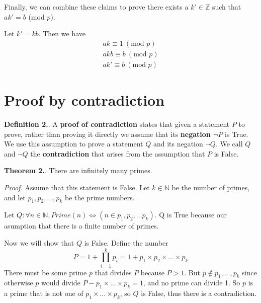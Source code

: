 \documentclass{article}
\newcounter{defcount}
\newcounter{thcount}
\newcommand\df{\stepcounter{defcount} \textbf{Definition 2.\thedefcount}. }
\newcommand\tr{\stepcounter{thcount} \textbf{Theorem 2.\thethcount}. }
\begin{document}
Finally, we can combine these claims to prove there exists a $k' \in \mathbb{Z}$ 
such that $ak' = b$ (mod $p$).

Let $k' = kb$. Then we have 
\begin{align*}
    ak \equiv 1 \:(\text{mod } p) \\
    akb \equiv b \:(\text{mod } p) \\
    ak' \equiv b \:(\text{mod } p) 
\end{align*}

\section{Proof by contradiction}
\df A \textbf{proof of contradiction} states that given a statement $P$ to 
prove, rather than proving it directly we assume that its \textbf{negation
$\neg P$} is True. We use this assumption to prove a statement $Q$ and its 
negation $\neg Q$. We call $Q$ and $\neg Q$ the \textbf{contradiction} that 
arises from the assumption that $P$ is False.

\tr There are infinitely many primes.

\textit{Proof.} Assume that this statement is False. Let $k \in \mathbb{N}$ be
the number of primes, and let $p_1, p_2, \ldots, p_k$ be the prime numbers. 

Let $Q : \forall n \in \mathbb{N}, Prime(n) \Leftrightarrow (n \in p_1, p_2,
\ldots p_k)$. Q is True because our asumption that there is a finite number of 
primes. 

Now we will show that $Q$ is False. Define the number 
$$P = 1 + \prod_{i = 1}^{k} p_i = 1 + p_1 \times p_2 \times \ldots \times p_k $$
There must be some prime $p$ that divides $P$ because $P > 1$. But $p \notin 
{p_1, \ldots, p_k}$ since otherwise $p$ would divide $P - p_1 \times \ldots 
\times p_k = 1$, and no prime can divide 1. So $p$ is a prime that is not 
one of ${p_1 \times \ldots \times p_k}$, so $Q$ is False, thus there is a 
contradiction. 
\end{document}

